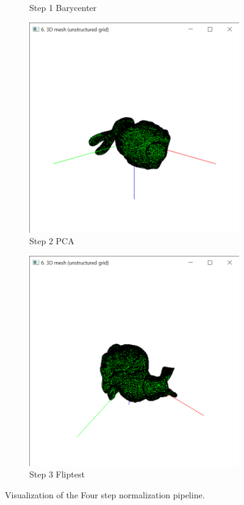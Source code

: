\documentclass{bigdata}
\begin{document}
\begin{figure}[h!]
\begin{subfigure}[b]{0.4\linewidth}
    \caption{Step 1 Barycenter}
  \end{subfigure}
  \begin{subfigure}[b]{0.4\linewidth}
    \includegraphics[width=\linewidth]{Pictures/Part2/step2.png}
    \caption{Step 2 PCA}
  \end{subfigure}
  \begin{subfigure}[b]{0.4\linewidth}
    \includegraphics[width=\linewidth]{Pictures/Part2/step3.png}
    \caption{Step 3 Fliptest}
  \end{subfigure}
  \caption{Visualization of the Four step normalization pipeline.}
  \label{fig:bunny}
\end{figure}
\end{document}
